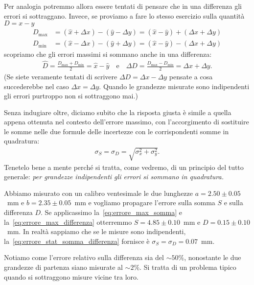 Per analogia potremmo allora essere tentati di pensare che in una differenza gli
errori si sottraggano. Invece, se proviamo a fare lo stesso esercizio sulla
quantità $D = x - y$
\begin{align*}
  D_{\max} &= (\hat{x} + \Delta x) - (\hat{y} - \Delta y) =
  (\hat{x} - \hat{y}) + (\Delta x + \Delta y)\\
  D_{\min} &= (\hat{x} - \Delta x) - (\hat{y} + \Delta y) =
  (\hat{x} - \hat{y}) - (\Delta x + \Delta y)
\end{align*}
scopriamo che gli errori massimi si sommano anche in una differenza:
\begin{align}\label{eq:errore_max_differenza}
  \hat{D} = \frac{D_{\max} + D_{\min}}{2} = \hat{x} - \hat{y}
  \quad \text{e} \quad
  \Delta D = \frac{D_{\max} - D_{\min}}{2} = \Delta x + \Delta y.
\end{align}
(Se siete veramente tentati di scrivere $\Delta D = \Delta x - \Delta y$
pensate a cosa succederebbe nel caso $\Delta x = \Delta y$. Quando le grandezze
misurate sono indipendenti gli errori purtroppo non si sottraggono mai.)

Senza indugiare oltre, diciamo subito che la risposta giusta è simile a
quella appena ottenuta nel contesto dell'errore massimo, con l'accorgimento
di sostituire le somme nelle due formule delle incertezze con le corrispondenti
somme in quadratura:
\begin{align}\label{eq:errore_stat_somma_differenza}
  \sigma_S = \sigma_D = \sqrt{\sigma_x^2 + \sigma_y^2}.
\end{align}
Tenetelo bene a mente perché si tratta, come vedremo, di un principio del
tutto generale: \emph{per grandezze indipendenti gli errori si sommano
in quadratura.}


\begin{examplebox}
  \begin{example}\label{exp:errore_max_somma_differenza}
    Abbiamo misurato con un calibro ventesimale le due lunghezze
    $a = 2.50 \pm 0.05$~mm e $b = 2.35 \pm 0.05$~mm e vogliamo propagare
    l'errore sulla somma $S$ e sulla differenza $D$.
    Se applicassimo la~\eqref{eq:errore_max_somma} e
    la~\eqref{eq:errore_max_differenza} otterremmo $S = 4.85 \pm 0.10$~mm e
    $D = 0.15 \pm 0.10$~mm.
    In realtà sappiamo che se le misure sono indipendenti,
    la~\eqref{eq:errore_stat_somma_differenza} fornisce
    è $\sigma_S = \sigma_D = 0.07$~mm.

    Notiamo come l'errore relativo sulla differenza sia del $\sim 50\%$,
    nonostante le due grandezze di partenza siano misurate al $\sim 2\%$.
    Si tratta di un problema tipico quando si sottraggono misure vicine tra
    loro.
  \end{example}
\end{examplebox}


